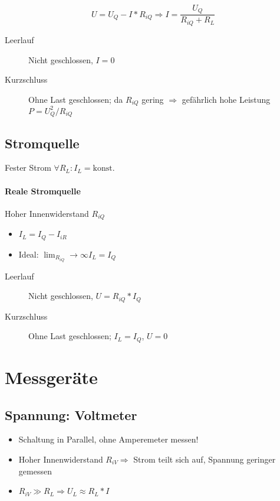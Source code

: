 $$U = U_Q - I * R_{iQ} \Rightarrow I = \frac{U_Q}{R_{iQ} + R_L}$$

\begin{description}
  \item[Leerlauf] Nicht geschlossen, $I = 0$
  \item[Kurzschluss] Ohne Last geschlossen; da $R_{iQ}$ gering $\Rightarrow$ gefährlich hohe Leistung $P = U_Q^2 / R_{iQ}$
\end{description}

\subsection{Stromquelle}

Fester Strom $\forall R_L: I_L = \text{konst.}$

\paragraph{Reale Stromquelle} Hoher Innenwiderstand $R_{iQ}$

\begin{itemize}
  \item $I_L = I_Q - I_{iR}$
  \item Ideal: $\lim_{R_{iQ}} \rightarrow \infty I_L = I_Q$
\end{itemize}

\begin{description}
  \item[Leerlauf] Nicht geschlossen, $U = R_{iQ} * I_Q$
  \item[Kurzschluss] Ohne Last geschlossen; $I_L = I_Q$, $U = 0$
\end{description}

\section{Messgeräte}

\subsection{Spannung: Voltmeter}

\begin{itemize}
  \item Schaltung in Parallel, ohne Amperemeter messen!
  \item Hoher Innenwiderstand $R_{iV} \Rightarrow$ Strom teilt sich auf, Spannung geringer gemessen
  \item $R_{iV} \gg R_L \Rightarrow U_L \approx R_L * I$
\end{itemize}

